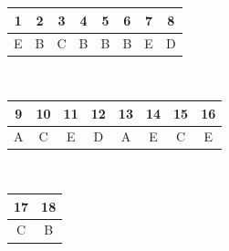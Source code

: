 \documentclass[11pt,a4paper]{article}
\begin{document}
\begin{center}
{\renewcommand{\arraystretch}{1.25}
\begin{tabular}{cccccccc}
  \toprule
  1 & 2 & 3 & 4 & 5 & 6 & 7 & 8 \\
  \midrule
  E & B & C & B & B & B & E & D \\
  \bottomrule
\end{tabular}\\[0.7em]
\begin{tabular}{cccccccc}
  \toprule
  9 & 10 & 11 & 12 & 13 & 14 & 15 & 16 \\
  \midrule
  A & C & E & D & A & E & C & E \\
  \bottomrule
\end{tabular}\\[0.7em]
\begin{tabular}{cc}
  \toprule
  17 & 18 \\
  \midrule
  C & B \\
  \bottomrule
\end{tabular}}
\end{center}

\medskip
\end{document}
